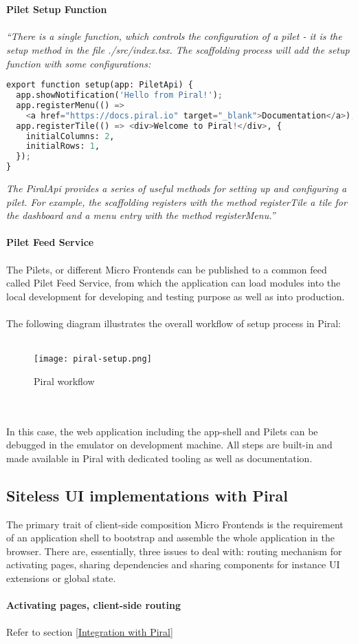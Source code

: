 \documentclass[a4paper]{book}
\begin{document}
\\ \\
\textbf{Pilet Setup Function}
\\ \\
\textit{“There is a single function, which controls the configuration of a pilet - it is the setup method in the file ./src/index.tsx. The scaffolding process will add the setup function with some configurations:}
\begin{lstlisting}[language=Python]
export function setup(app: PiletApi) {
  app.showNotification('Hello from Piral!');
  app.registerMenu(() =>
    <a href="https://docs.piral.io" target="_blank">Documentation</a>);
  app.registerTile(() => <div>Welcome to Piral!</div>, {
    initialColumns: 2,
    initialRows: 1,
  });
}
\end{lstlisting}
\textit{The PiralApi provides a series of useful methods for setting up and configuring a pilet. For example, the scaffolding registers with the method registerTile a tile for the dashboard and a menu entry with the method registerMenu.”}
\\ \\
\textbf{Pilet Feed Service }
\\ \\
The Pilets, or different Micro Frontends can be published to a common feed called Pilet Feed Service, from which the application can load modules into the local development for developing and testing purpose as well as into production.
\\ \\
The following diagram illustrates the overall workflow of setup process in Piral:
\\ \\
\begin{figure}[h!]
  \centering
  \captionsetup{justification=centering}
  \texttt{[image: piral-setup.png]}
   \caption{Piral workflow}
  \label{fig:8}
\end{figure}
\\ \\
In this case, the web application including the app-shell and Pilets can be debugged in the emulator on development machine. All steps are built-in and made available in Piral with dedicated tooling as well as documentation.

\subsection{Siteless UI implementations with Piral}
The primary trait of client-side composition Micro Frontends is the requirement of an application shell to bootstrap and assemble the whole application in the browser. There are, essentially, three issues to deal with: routing mechanism for activating pages, sharing dependencies and sharing components for instance UI extensions or global state. 
\\ \\ 
\textbf{Activating pages, client-side routing}
\\ \\ 
Refer to section \ref{Integration with Piral}
\end{document}
